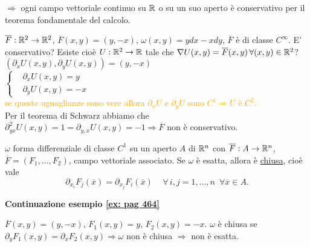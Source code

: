 \begin{attbar}
	$ \Rightarrow$ ogni campo vettoriale continuo su $\mathbb{R}$ o su un suo aperto è conservativo per il teorema fondamentale del calcolo.
\end{attbar}


\begin{exbar}
\begin{example}
	\label{ex: pag 464}
	$\overline{F}:\mathbb{R}^2\rightarrow \mathbb{R}^2$, $\overline{F}(x,y)=(y,-x)$, $\omega (x,y)=ydx-xdy$, $\overline{F}$ è di classe $C^\infty$. E' conservativo? Esiste cioè $U:\mathbb{R}^2 \rightarrow \mathbb{R}$ tale che $\nabla U(x,y)=\overline{F}(x,y)\,\forall (x,y)\in \mathbb{R}^2$?\\
	$(\partial_xU(x,y),\partial_yU(x,y))=(y,-x)$\\
	$\begin{cases}
		&\partial_xU(x,y)=y\\
		&\partial_yU(x,y)=-x
	\end{cases}$\\
	\textcolor{orange}{se queste uguaglianze sono vere allora $\partial_xU$ e $\partial_yU$ sono $C^1 \Rightarrow U$ è $C^2$.}\\
	Per il teorema di Schwarz abbiamo che $\partial_{yx}^2U(x,y)=1=\partial_{y,x}U(x,y)=-1 \Rightarrow \overline{F}$ non è conservativo.
\end{example}
\end{exbar}


\begin{theorem}
	
	\label{th: pag 465}
	$\omega$ forma differenziale di classe $C^1$ su un aperto $A$ di $\mathbb{R}^n$ con $\overline{F}:A \rightarrow \mathbb{R}^n$,  $\overline{F}=(F_1,...,F_2)$, campo vettoriale associato. Se $\omega$ è esatta, allora è \underline{chiusa}, cioè vale
	\begin{equation*}
		\partial_{x_i}F_j(\overline{x})=\partial_{x_j}F_i(\overline{x})\,\,\,\,\,\,\,\forall \, i,j=1,...,n\,\,\, \forall \overline{x}\in A.
	\end{equation*}
\end{theorem}


\begin{exbar}
	\textbf{Continuazione esempio \ref{ex: pag 464}}
	
	$\overline{F}(x,y)=(y,-x)$, $F_1(x,y)=y$, $F_2(x,y)=-x$. $\omega$ è chiusa se $\partial_yF_1(x,y)=\partial_xF_2(x,y)\Rightarrow \omega$ non è chiusa $\Rightarrow$ non è esatta.
\end{exbar}
	
